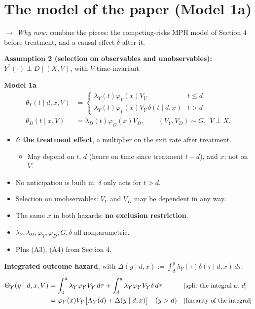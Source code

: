 \documentclass[11pt]{article}
\newcommand{\1}{\mathbf{1}}
\newcommand{\why}[1]{\text{\small[#1]}}
\newcommand{\whynow}[1]{\par\noindent\textit{$\rightarrow$ Why now:} #1\par}
\begin{document}
\section{The model of the paper (Model 1a)}
\whynow{combine the pieces: the competing-risks MPH model of Section 4 before treatment, and a causal effect $\delta$ after it.}

\textbf{Assumption 2 (selection on observables and unobservables):} $Y^*(\cdot)\perp D\mid(X,V)$, with $V$ time-invariant.

\textbf{Model 1a}
\begin{align}
  \theta_Y(t\mid d,x,V) &= \begin{cases}\lambda_Y(t)\varphi_Y(x)V_Y & t\le d\\ \lambda_Y(t)\varphi_Y(x)V_Y\,\delta(t\mid d,x) & t>d\end{cases} \nonumber\\
  \theta_D(t\mid x,V) &= \lambda_D(t)\varphi_D(x)V_D, \qquad (V_Y,V_D)\sim G,\ \ V\perp X. \nonumber
\end{align}
\begin{itemize}
  \item $\delta$: \textbf{the treatment effect}, a multiplier on the exit rate after treatment.
    \begin{itemize}
      \item May depend on $t$, $d$ (hence on time since treatment $t-d$), and $x$; not on $V$.
    \end{itemize}
  \item No anticipation is built in: $\delta$ only acts for $t>d$.
  \item Selection on unobservables: $V_Y$ and $V_D$ may be dependent in any way.
  \item The same $x$ in both hazards: \textbf{no exclusion restriction}.
  \item $\lambda_Y,\lambda_D,\varphi_Y,\varphi_D,G,\delta$ all nonparametric.
  \item Plus (A3), (A4) from Section 4.
\end{itemize}

\textbf{Integrated outcome hazard}, with $\Delta(y\mid d,x):=\int_d^y\lambda_Y(\tau)\delta(\tau\mid d,x)\,d\tau$:
\begin{align}
  \Theta_Y(y\mid d,x,V) &= \int_0^d\lambda_Y\varphi_YV_Y\,d\tau+\int_d^y\lambda_Y\varphi_YV_Y\delta\,d\tau && \why{split the integral at $d$} \nonumber\\
  &= \varphi_Y(x)V_Y\big[\Lambda_Y(d)+\Delta(y\mid d,x)\big] \quad (y>d) && \why{linearity of the integral} \label{eq:ThetaY}
\end{align}
\end{document}
